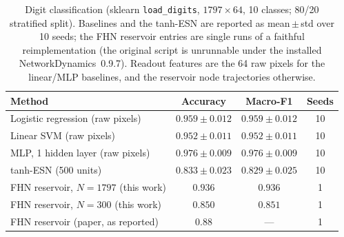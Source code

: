 \begin{table}[t]
  \centering
  \caption{Digit classification (sklearn \texttt{load\_digits}, $1797\times64$,
    10 classes; 80/20 stratified split). Baselines and the tanh-ESN are reported
    as mean\,$\pm$\,std over 10 seeds; the FHN reservoir entries are single runs
    of a faithful reimplementation (the original script is unrunnable under the
    installed NetworkDynamics~0.9.7). Readout features are the 64 raw pixels for
    the linear/MLP baselines, and the reservoir node trajectories otherwise.}
  \label{tab:digits_results}
  \begin{tabular}{lccc}
    \toprule
    Method & Accuracy & Macro-F1 & Seeds \\
    \midrule
    Logistic regression (raw pixels) & $0.959 \pm 0.012$ & $0.959 \pm 0.012$ & 10 \\
    Linear SVM (raw pixels)          & $0.952 \pm 0.011$ & $0.952 \pm 0.011$ & 10 \\
    MLP, 1 hidden layer (raw pixels) & $\mathbf{0.976 \pm 0.009}$ & $\mathbf{0.976 \pm 0.009}$ & 10 \\
    tanh-ESN (500 units)             & $0.833 \pm 0.023$ & $0.829 \pm 0.025$ & 10 \\
    \midrule
    FHN reservoir, $N=1797$ (this work) & $0.936$ & $0.936$ & 1 \\
    FHN reservoir, $N=300$ (this work)  & $0.850$ & $0.851$ & 1 \\
    FHN reservoir (paper, as reported)  & $0.88$  & ---     & 1 \\
    \bottomrule
  \end{tabular}
\end{table}
